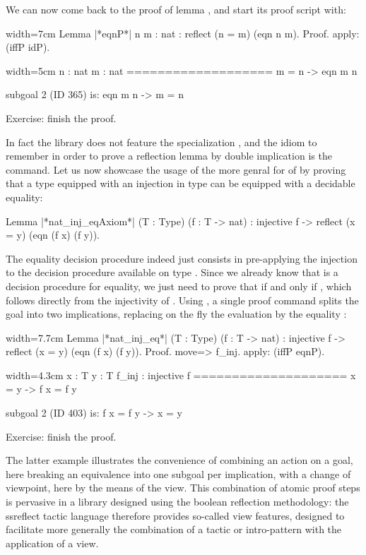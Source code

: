 We can now come back to the proof of lemma , and start its
proof script with:

\begin{coq}{}{width=7cm}
Lemma |*eqnP*| {n m : nat} :
  reflect (n = m) (eqn n m).
Proof.
apply: (iffP idP).
\end{coq}
\begin{coqout}{}{width=5cm}
n : nat
m : nat
===================
 m = n -> eqn m n

subgoal 2 (ID 365) is:
 eqn m n -> m = n
\end{coqout}
Exercise: finish the proof.

In fact the library does not feature the specialization ,
and the idiom to remember in order to prove a reflection lemma by
double implication is the  command. Let us now
showcase the usage of the more genral for of  by proving
that a type equipped with an injection in type  can be equipped
with a decidable equality:

\begin{coq}{}{}
Lemma |*nat_inj_eqAxiom*| (T : Type) (f : T -> nat) :
  injective f -> reflect (x = y) (eqn (f x) (f y)).
\end{coq}
The equality decision procedure indeed just consists in pre-applying
the injection  to the decision procedure  available on
type . Since we already know that  is a decision
procedure for equality, we just need to prove that  if and
only if , which  follows directly from the injectivity of
. Using , a single proof command splits the goal into two
implications, replacing on the fly the evaluation
 by the  equality :

\begin{coq}{}{width=7.7cm}
Lemma |*nat_inj_eq*| (T : Type) (f : T -> nat) :
injective f ->
  reflect (x = y) (eqn (f x) (f y)).
Proof.
move=> f_inj.
apply: (iffP eqnP).
\end{coq}
\begin{coqout}{}{width=4.3cm}
x : T
y : T
f_inj : injective f
====================
x = y -> f x = f y

subgoal 2 (ID 403) is:
 f x = f y -> x = y
\end{coqout}
Exercise: finish the proof.

The latter example illustrates the convenience of combining an action
on a goal, here breaking an equivalence into one subgoal per
implication, with a change of viewpoint, here by the means of the
 view. This combination of atomic proof steps is pervasive in
a library designed using the boolean reflection methodology: the
ssreflect tactic language therefore provides so-called view features,
designed to facilitate more generally the combination of a tactic or
intro-pattern with the application of a view.

